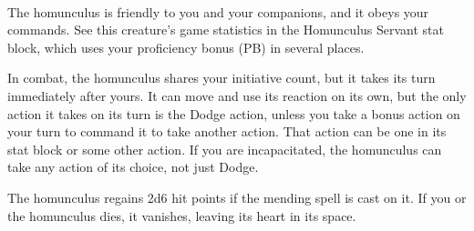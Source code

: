 \documentclass[letterpaper,openany,oneside,twocolumn]{book}
\begin{document}
\vspace*{-3.6\fontdimen6\font}\hfill\\
\eject
The homunculus is friendly to you and your companions, and it obeys your commands. See this creature's game statistics in the Homunculus Servant stat block, which uses your proficiency bonus (PB) in several places.

In combat, the homunculus shares your initiative count, but it takes its turn immediately after yours. It can move and use its reaction on its own, but the only action it takes on its turn is the Dodge action, unless you take a bonus action on your turn to command it to take another action. That action can be one in its stat block or some other action. If you are incapacitated, the homunculus can take any action of its choice, not just Dodge.

The homunculus regains 2d6 hit points if the mending spell is cast on it. If you or the homunculus dies, it vanishes, leaving its heart in its space.
\end{document}
